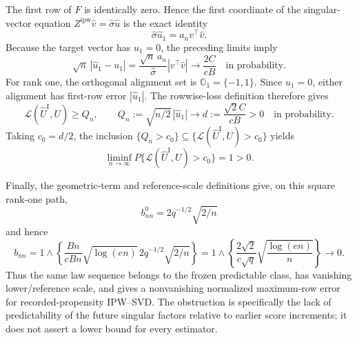 The first row of \(F\) is identically zero.  Hence the first coordinate of the singular-vector equation \(Z^{\mathrm{ipw}}\widehat v=\widehat\sigma\widehat u\) is the exact identity
\[
\widehat\sigma\widehat u_1=a_n v^\top\widehat v.
\]
Because the target vector has \(u_1=0\), the preceding limits imply
\[
\sqrt n\,|\widehat u_1-u_1|
=\frac{\sqrt n\,a_n}{\widehat\sigma}|v^\top\widehat v|
\longrightarrow\frac{2C}{cB}
\quad\text{in probability}.
\]
For rank one, the orthogonal alignment set is \(\mathbb O_1=\{-1,1\}\).  Since \(u_1=0\), either alignment has first-row error \(|\widehat u_1|\).  The rowwise-loss definition therefore gives
\[
\mathcal L(\widehat U^{\mathrm I},U)
\ge Q_n,
\qquad
Q_n:=\sqrt{n/2}\,|\widehat u_1|
\longrightarrow d:=\frac{\sqrt2 C}{cB}>0
\quad\text{in probability}.
\]
Taking \(c_0=d/2\), the inclusion \(\{Q_n>c_0\}\subseteq\{\mathcal L(\widehat U^{\mathrm I},U)>c_0\}\) yields
\[
\liminf_{n\to\infty}P\{\mathcal L(\widehat U^{\mathrm I},U)>c_0\}=1>0.
\]

Finally, the geometric-term and reference-scale definitions give, on this square rank-one path,
\[
b^0_{nn}=2q^{-1/2}\sqrt{2/n}
\]
and hence
\[
b_{nn}
=1\wedge\left\{
\frac{Bn}{cBn}\sqrt{\log(en)}\,
2q^{-1/2}\sqrt{2/n}
\right\}
=1\wedge\left\{\frac{2\sqrt2}{c\sqrt q}
\sqrt{\frac{\log(en)}n}\right\}
\longrightarrow0.
\]
Thus the same law sequence belongs to the frozen predictable class, has vanishing lower/reference scale, and gives a nonvanishing normalized maximum-row error for recorded-propensity IPW--SVD.  The obstruction is specifically the lack of predictability of the future singular factors relative to earlier score increments; it does not assert a lower bound for every estimator.

